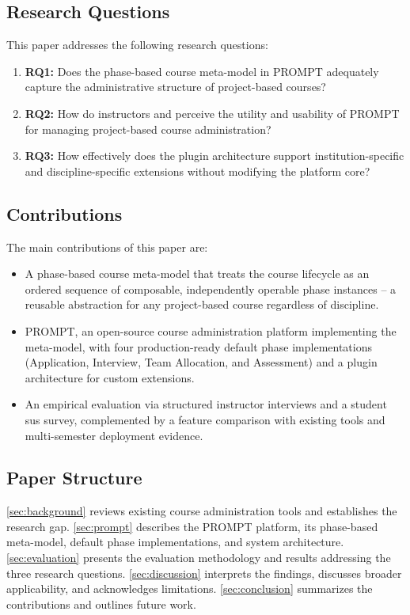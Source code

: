 \subsection{Research Questions}

This paper addresses the following research questions:
\begin{enumerate}
    \item \textbf{RQ1:} Does the phase-based course meta-model in PROMPT adequately capture the administrative structure of project-based courses?
    \item \textbf{RQ2:} How do instructors and  perceive the utility and usability of PROMPT for managing project-based course administration?
    \item \textbf{RQ3:} How effectively does the plugin architecture support institution-specific and discipline-specific extensions without modifying the platform core?
\end{enumerate}

\subsection{Contributions}

The main contributions of this paper are:
\begin{itemize}
    \item A phase-based course meta-model that treats the course lifecycle as an ordered sequence of composable, independently operable phase instances -- a reusable abstraction for any project-based course regardless of discipline.
    \item PROMPT, an open-source course administration platform implementing the meta-model, with four production-ready default phase implementations (Application, Interview, Team Allocation, and Assessment) and a plugin architecture for custom extensions.
    \item An empirical evaluation via structured instructor interviews and a student \acrshort{sus} survey, complemented by a feature comparison with existing tools and multi-semester deployment evidence.
\end{itemize}

\subsection{Paper Structure}

\autoref{sec:background} reviews existing course administration tools and establishes the research gap.
\autoref{sec:prompt} describes the PROMPT platform, its phase-based meta-model, default phase implementations, and system architecture.
\autoref{sec:evaluation} presents the evaluation methodology and results addressing the three research questions.
\autoref{sec:discussion} interprets the findings, discusses broader applicability, and acknowledges limitations.
\autoref{sec:conclusion} summarizes the contributions and outlines future work.
